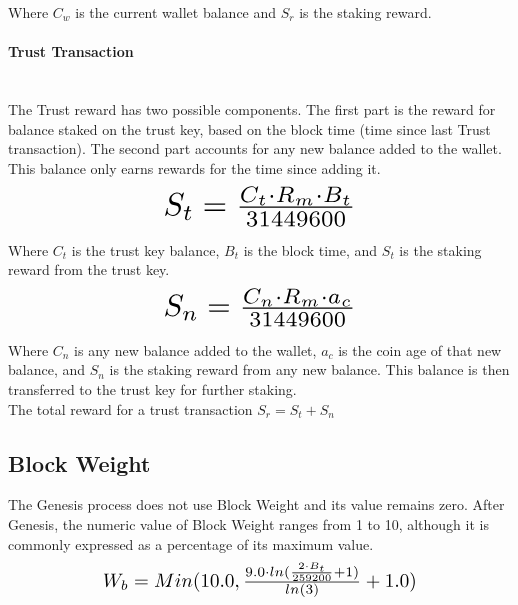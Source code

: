 \documentclass[11pt]{article}
\begin{document}
\noindent Where $C_{w}$ is the current wallet balance and $S_{r}$ is the staking reward.

\paragraph{Trust Transaction} ~\\
The Trust reward has two possible components. The first part is the reward for balance staked on the trust key, based on the block time (time since last Trust transaction). The second part accounts for any new balance added to the wallet. This balance only earns rewards for the time since adding it.\\

\begin{equation}
\resizebox{.40\hsize}{!}{$S_{t} = \frac{C_{t} \cdot R_{m} \cdot B_{t}}{31449600}$}
\end{equation}

\noindent Where $C_{t}$ is the trust key balance, $B_{t}$ is the block time, and $S_{t}$ is the staking reward from the trust key.\\

\begin{equation}
\resizebox{.40\hsize}{!}{$S_{n} = \frac{C_{n} \cdot R_{m} \cdot a_c}{31449600}$}
\end{equation}

\noindent Where $C_{n}$ is any new balance added to the wallet, $a_c$ is the coin age of that new balance, and $S_{n}$ is the staking reward from any new balance. This balance is then transferred to the trust key for further staking.\\

\noindent The total reward for a trust transaction $S_{r} = S_{t} + S_{n}$\\


\subsection{Block Weight}
The Genesis process does not use Block Weight and its value remains zero. After Genesis, the numeric value of Block Weight ranges from 1 to 10, although it is commonly expressed as a percentage of its maximum value.\\

\begin{equation}
\resizebox{.65\hsize}{!}{$W_{b} = Min(10.0, \frac{9.0 \cdot ln(\frac{2 \cdot B_{t}}{259200} + 1)}{ln(3)} + 1.0)$}
\end{equation}\\
\end{document}
